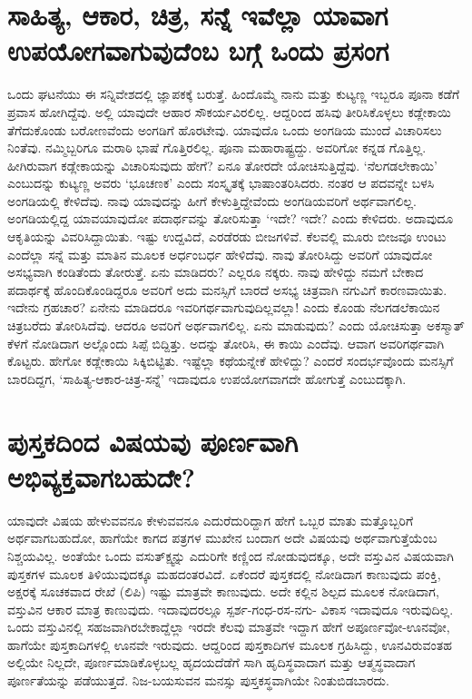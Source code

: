\section*{ಸಾಹಿತ್ಯ, ಆಕಾರ, ಚಿತ್ರ, ಸನ್ನೆ ಇವೆಲ್ಲಾ ಯಾವಾಗ ಉಪಯೋಗವಾಗುವುದೆಂಬ ಬಗ್ಗೆ ಒಂದು ಪ್ರಸಂಗ}

ಒಂದು ಘಟನೆಯು ಈ ಸನ್ನಿವೇಶದಲ್ಲಿ ಜ್ಞಾಪಕಕ್ಕೆ ಬರುತ್ತೆ. ಹಿಂದೊಮ್ಮೆ ನಾನು ಮತ್ತು ಕುಟ್ಯಣ್ಣ ಇಬ್ಬರೂ ಪೂನಾ ಕಡೆಗೆ ಪ್ರವಾಸ ಹೋಗಿದ್ದೆವು. ಅಲ್ಲಿ ಯಾವುದೇ ಆಹಾರ ಸೌಕರ್ಯವಿರಲಿಲ್ಲ. ಆದ್ದರಿಂದ ಹಸಿವು ತೀರಿಸಿಕೊಳ್ಳಲು ಕಡ್ಲೇಕಾಯಿ ತೆಗೆದುಕೊಂಡು ಬರೋಣವೆಂದು ಅಂಗಡಿಗೆ ಹೊರಟೇವು. ಯಾವುದೊ ಒಂದು ಅಂಗಡಿಯ ಮುಂದೆ ವಿಚಾರಿಸಲು ನಿಂತೆವು. ನಮ್ಮಿಬ್ಬರಿಗೂ ಮರಾಠಿ ಭಾಷೆ ಗೊತ್ತಿರಲಿಲ್ಲ. ಪೂನಾ ಮಹಾರಾಷ್ಟ್ರದ್ದು. ಅವರಿಗೋ ಕನ್ನಡ ಗೊತ್ತಿಲ್ಲ. ಹೀಗಿರುವಾಗ ಕಡ್ಲೇಕಾಯನ್ನು ವಿಚಾರಿಸುವುದು ಹೇಗೆ? ಏನೂ ತೋರದೇ ಯೋಚಿಸುತ್ತಿದ್ದೆವು. `ನೆಲಗಡಲೇಕಾಯಿ' ಎಂಬುದನ್ನು ಕುಟ್ಯಣ್ಣ ಅವರು `ಭೂಚಣಕ' ಎಂದು ಸಂಸ್ಕೃತಕ್ಕೆ  ಭಾಷಾಂತರಿಸಿದರು. ನಂತರ ಆ ಪದವನ್ನೇ ಬಳಸಿ ಅಂಗಡಿಯಲ್ಲಿ ಕೇಳಿದೆವು. ನಾವು ಯಾವುದನ್ನು ಹೀಗೆ ಕೇಳುತ್ತಿದ್ದೇವೆಂದು ಅಂಗಡಿಯವರಿಗೆ ಅರ್ಥವಾಗಲಿಲ್ಲ. ಅಂಗಡಿಯಲ್ಲಿದ್ದ ಯಾವಯಾವುದೋ ಪದಾರ್ಥವನ್ನು ತೋರಿಸುತ್ತಾ `ಇದೇ? ಇದೇ? ಎಂದು ಕೇಳಿದರು. ಅದಾವುದೂ ಆಕೃತಿಯನ್ನು ವಿವರಿಸಿದ್ದಾಯಿತು. ಇಷ್ಟು ಉದ್ದವಿದೆ, ಎರಡೆರಡು ಬೀಜಗಳಿವೆ. ಕೆಲವಲ್ಲಿ ಮೂರು ಬೀಜವೂ ಉಂಟು ಎಂದೆಲ್ಲಾ ಸನ್ನೆ ಮತ್ತು ಮಾತಿನ ಮೂಲಕ ಅರ್ಧಂಬರ್ಧ ಹೇಳಿದೆವು. ನಾವು ತೋರಿಸಿದ್ದು ಅವರಿಗೆ ಯಾವುದೋ ಅಸಭ್ಯವಾಗಿ ಕಂಡಿತೆಂದು ತೋರುತ್ತೆ. ಏನು ಮಾಡಿದರು? ಎಲ್ಲರೂ ನಕ್ಕರು. ನಾವು ಹೇಳಿದ್ದು ನಮಗೆ ಬೇಕಾದ ಪದಾರ್ಥಕ್ಕೆ ಹೊಂದಿಕೊಂಡಿದ್ದರೂ ಅವರಿಗೆ ಅದು ಮನಸ್ಸಿಗೆ ಬಾರದೆ ಅಸಭ್ಯ ಚಿತ್ರವಾಗಿ ನಗುವಿಗೆ ಕಾರಣವಾಯಿತು. ಇದೇನು ಗ್ರಹಚಾರ? ಏನೇನು ಮಾಡಿದರೂ ಇವರಿಗರ್ಥವಾಗುವುದಿಲ್ಲವಲ್ಲಾ! ಎಂದು ಕೊಂಡು ನೆಲಗಡಲೆಕಾಯಿನ ಚಿತ್ರಬರೆದು ತೋರಿಸಿದೆವು. ಆದರೂ ಅವರಿಗೆ ಅರ್ಥವಾಗಲಿಲ್ಲ. ಏನು ಮಾಡುವುದು? ಎಂದು ಯೋಚಿಸುತ್ತಾ ಅಕಸ್ಮಾತ್ ಕೆಳಗೆ ನೋಡಿದಾಗ ಅಲ್ಲೊಂದು ಸಿಪ್ಪೆ ಬಿದ್ದಿತ್ತು. ಅದನ್ನು ತೋರಿಸಿ, ಈ ಕಾಯಿ ಎಂದೆವು. ಆವಾಗ ಅವರಿಗರ್ಥವಾಗಿ ಕೊಟ್ಟರು. ಹೇಗೋ ಕಡ್ಲೇಕಾಯಿ ಸಿಕ್ಕಿಬಿಟ್ಟಿತು. ಇಷ್ಟೆಲ್ಲಾ ಕಥೆಯನ್ನೇಕೆ ಹೇಳಿದ್ದು? ಎಂದರೆ ಸಂದರ್ಭವೊಂದು ಮನಸ್ಸಿಗೆ ಬಾರದಿದ್ದಗ, `ಸಾಹಿತ್ಯ-ಆಕಾರ-ಚಿತ್ರ-ಸನ್ನೆ' ಇದಾವುದೂ ಉಪಯೋಗವಾಗದೇ ಹೋಗುತ್ತೆ ಎಂಬುದಕ್ಕಾಗಿ.

\section*{ಪುಸ್ತಕದಿಂದ ವಿಷಯವು ಪೂರ್ಣವಾಗಿ ಅಭಿವ್ಯಕ್ತವಾಗಬಹುದೇ?}

ಯಾವುದೇ ವಿಷಯ ಹೇಳುವವನೂ ಕೇಳುವವನೂ ಎದುರೆದುರಿದ್ದಾಗ ಹೇಗೆ ಒಬ್ಬರ ಮಾತು ಮತ್ತೊಬ್ಬರಿಗೆ ಅರ್ಥವಾಗಬಹುದೋ, ಹಾಗೆಯೇ ಕಾಗದ ಪತ್ರಗಳ ಮುಖೇನ ಬಂದಾಗ ಅದೇ ವಿಷಯವು ಅರ್ಥವಾಗುತ್ತೆಯೆಂಬ ನಿಶ್ಚಯವಿಲ್ಲ. ಅಂತೆಯೇ ಒಂದು ವಸುತ್ಕ್ಷ್ವನ್ನು ಎದುರಿಗೇ ಕಣ್ಣಿಂದ ನೋಡುವುದಕ್ಕೂ, ಅದೇ ವಸ್ತುವಿನ ವಿಷಯವಾಗಿ ಪುಸ್ತಕಗಳ ಮೂಲಕ ತಿಳಿಯುವುದಕ್ಕೂ ಮಹದಂತರವಿದೆ. ಏಕೆಂದರೆ
ಪುಸ್ತಕದಲ್ಲಿ ನೋಡಿದಾಗ ಕಾಣುವುದು ಪಂಕ್ತಿ, ಅಕ್ಷರಕ್ಕೆ ಸೂಚಕವಾದ ರೇಖೆ (ಲಿಪಿ) ಇಷ್ಟು ಮಾತ್ರವೇ ಕಾಣುವುದು. ಅದೇ ಕಲ್ಲಿನ ಶಿಲ್ಪದ ಮೂಲಕ  ನೋಡಿದಾಗ, ವಸ್ತುವಿನ ಆಕಾರ ಮಾತ್ರ ಕಾಣುವುದು. ಇದಾವುದರಲ್ಲೂ ಸ್ಪರ್ಶ-ಗಂಧ-ರಸ-ನಗು- ವಿಕಾಸ ಇದಾವುದೂ ಇರುವುದಿಲ್ಲ. ಒಂದು ವಸ್ತುವಿನಲ್ಲಿ ಸಹಜವಾಗಿರಬೇಕಾದ್ದೆಲ್ಲಾ ಇರದೇ ಕೆಲವು ಮಾತ್ರವೇ ಇದ್ದಾಗ ಹೇಗೆ ಅಪೂರ್ಣವೋ-ಊನವೋ, ಹಾಗೆಯೇ ಪುಸ್ತಕಾದಿಗಳಲ್ಲಿ ಊನವೇ ಇರುವುದು. ಆದ್ದರಿಂದ ಪುಸ್ತಕಾದಿಗಳ ಮೂಲಕ ಗ್ರಹಿಸಿದ್ದು, ಊನವಿರುವಂತಹ ಅಲ್ಲಿಯೇ ನಿಲ್ಲದೇ, ಪೂರ್ಣಮಾಡಿಕೊಳ್ಳಬಲ್ಲ ಹೃದಯದೆಡೆಗೆ ಸಾಗಿ ಹೃದಿಸ್ಥವಾದಾಗ ಮತ್ತು ಆತ್ಮಸ್ಥವಾದಾಗ ಪೂರ್ಣತೆಯನ್ನು ಪಡೆಯುತ್ತದೆ. ನಿಜ-ಬಯಸುವನ ಮನಸ್ಸು ಪುಸ್ತಕಸ್ಥವಾಗಿಯೇ ನಿಂತುಬಿಡಬಾರದು.

